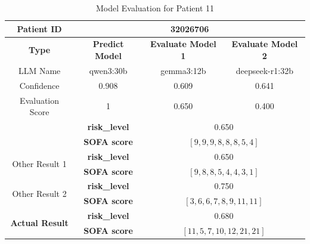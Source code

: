 \begin{table}[htbp]
 \centering
 \caption{Model Evaluation for Patient 11}
 \label{tab:patient11}
 \begin{tabular}{cccc}
 \toprule
 \textbf{ Patient ID } & \multicolumn{3}{c}{32026706} \\
 \midrule
 \textbf{ Type } & \textbf{ Predict Model } & \textbf{ Evaluate Model 1 } & \textbf{ Evaluate Model 2 } \\
 LLM Name & qwen3:30b & gemma3:12b & deepseek-r1:32b \\
 Confidence & 0.908 & 0.609 & 0.641 \\
 Evaluation Score & 1 & 0.650 & 0.400 \\
 \midrule
 \addlinespace
 \multirow{2}{*}{\textbf{ Best Result }} & \textbf{ risk\_level } & \multicolumn{2}{c}{0.650} \\
      & \textbf{ SOFA score } & \multicolumn{2}{c}{$[9, 9, 9, 8, 8, 8, 5, 4]$} \\
 \midrule
 \multirow{2}{*}{Other Result 1} & \textbf{ risk\_level } & \multicolumn{2}{c}{0.650} \\
      & \textbf{ SOFA score } & \multicolumn{2}{c}{$[9, 8, 8, 5, 4, 4, 3, 1]$} \\
 \midrule
 \multirow{2}{*}{Other Result 2} & \textbf{ risk\_level } & \multicolumn{2}{c}{0.750} \\
      & \textbf{ SOFA score } & \multicolumn{2}{c}{$[3, 6, 6, 7, 8, 9, 11, 11]$} \\
 \midrule
 \multirow{2}{*}{\textbf{ Actual Result }} & \textbf{ risk\_level } & \multicolumn{2}{c}{0.680} \\
      & \textbf{ SOFA score } & \multicolumn{2}{c}{$[11, 5, 7, 10, 12, 21, 21]$} \\
 \bottomrule
 \end{tabular}
\end{table}

